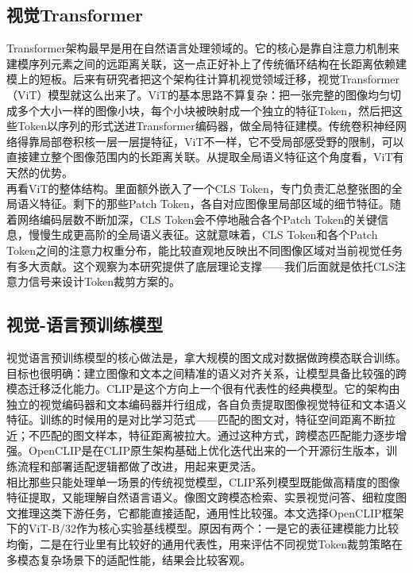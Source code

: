 \documentclass{article}
\begin{document}
{{{{{{		\subsection{视觉Transformer}
		{\setlength{\parindent}{2em}\setlength{\baselineskip}{20pt}\selectfont
			Transformer架构最早是用在自然语言处理领域的。它的核心是靠自注意力机制来建模序列元素之间的远距离关联，这一点正好补上了传统循环结构在长距离依赖建模上的短板。后来有研究者把这个架构往计算机视觉领域迁移，视觉Transformer（ViT）模型就这么出来了。ViT的基本思路不算复杂：把一张完整的图像均匀切成多个大小一样的图像小块，每个小块被映射成一个独立的特征Token，然后把这些Token以序列的形式送进Transformer编码器，做全局特征建模。传统卷积神经网络得靠局部卷积核一层一层提特征，ViT不一样，它不受局部感受野的限制，可以直接建立整个图像范围内的长距离关联。从提取全局语义特征这个角度看，ViT有天然的优势。\\
			再看ViT的整体结构。里面额外嵌入了一个CLS Token，专门负责汇总整张图的全局语义特征。剩下的那些Patch Token，各自对应图像里局部区域的细节特征。随着网络编码层数不断加深，CLS Token会不停地融合各个Patch Token的关键信息，慢慢生成更高阶的全局语义表征。这就意味着，CLS Token和各个Patch Token之间的注意力权重分布，能比较直观地反映出不同图像区域对当前视觉任务有多大贡献。这个观察为本研究提供了底层理论支撑——我们后面就是依托CLS注意力信号来设计Token裁剪方案的。
		\subsection{视觉-语言预训练模型}
		{\setlength{\parindent}{2em}\setlength{\baselineskip}{20pt}\selectfont
			视觉语言预训练模型的核心做法是，拿大规模的图文成对数据做跨模态联合训练。目标也很明确：建立图像和文本之间精准的语义对齐关系，让模型具备比较强的跨模态迁移泛化能力。CLIP是这个方向上一个很有代表性的经典模型。它的架构由独立的视觉编码器和文本编码器并行组成，各自负责提取图像视觉特征和文本语义特征。训练的时候用的是对比学习范式——匹配的图文对，特征空间距离不断拉近；不匹配的图文样本，特征距离被拉大。通过这种方式，跨模态匹配能力逐步增强。OpenCLIP是在CLIP原生架构基础上优化迭代出来的一个开源衍生版本，训练流程和部署适配逻辑都做了改进，用起来更灵活。\\
			相比那些只能处理单一场景的传统视觉模型，CLIP系列模型既能做高精度的图像特征提取，又能理解自然语言语义。像图文跨模态检索、实景视觉问答、细粒度图文推理这类下游任务，它都能直接适配，通用性比较强。本文选择OpenCLIP框架下的ViT-B/32作为核心实验基线模型。原因有两个：一是它的表征建模能力比较均衡，二是在行业里有比较好的通用代表性，用来评估不同视觉Token裁剪策略在多模态复杂场景下的适配性能，结果会比较客观。
}}}}}}}}
\end{document}
